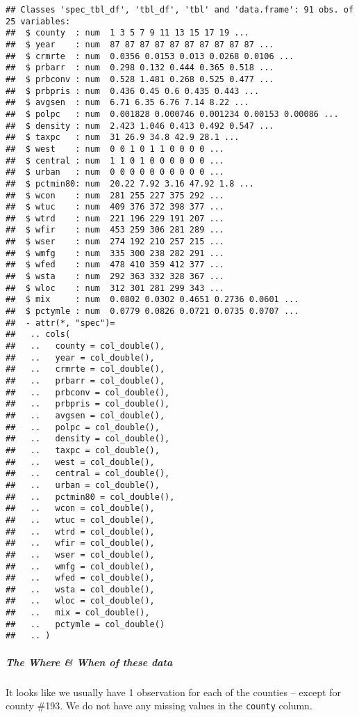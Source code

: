 \documentclass[]{article}
\let\oldsubparagraph\subparagraph
\renewcommand{\subparagraph}[1]{\oldsubparagraph{#1}\mbox{}}
\begin{document}
\begin{verbatim}
## Classes 'spec_tbl_df', 'tbl_df', 'tbl' and 'data.frame': 91 obs. of  25 variables:
##  $ county  : num  1 3 5 7 9 11 13 15 17 19 ...
##  $ year    : num  87 87 87 87 87 87 87 87 87 87 ...
##  $ crmrte  : num  0.0356 0.0153 0.013 0.0268 0.0106 ...
##  $ prbarr  : num  0.298 0.132 0.444 0.365 0.518 ...
##  $ prbconv : num  0.528 1.481 0.268 0.525 0.477 ...
##  $ prbpris : num  0.436 0.45 0.6 0.435 0.443 ...
##  $ avgsen  : num  6.71 6.35 6.76 7.14 8.22 ...
##  $ polpc   : num  0.001828 0.000746 0.001234 0.00153 0.00086 ...
##  $ density : num  2.423 1.046 0.413 0.492 0.547 ...
##  $ taxpc   : num  31 26.9 34.8 42.9 28.1 ...
##  $ west    : num  0 0 1 0 1 1 0 0 0 0 ...
##  $ central : num  1 1 0 1 0 0 0 0 0 0 ...
##  $ urban   : num  0 0 0 0 0 0 0 0 0 0 ...
##  $ pctmin80: num  20.22 7.92 3.16 47.92 1.8 ...
##  $ wcon    : num  281 255 227 375 292 ...
##  $ wtuc    : num  409 376 372 398 377 ...
##  $ wtrd    : num  221 196 229 191 207 ...
##  $ wfir    : num  453 259 306 281 289 ...
##  $ wser    : num  274 192 210 257 215 ...
##  $ wmfg    : num  335 300 238 282 291 ...
##  $ wfed    : num  478 410 359 412 377 ...
##  $ wsta    : num  292 363 332 328 367 ...
##  $ wloc    : num  312 301 281 299 343 ...
##  $ mix     : num  0.0802 0.0302 0.4651 0.2736 0.0601 ...
##  $ pctymle : num  0.0779 0.0826 0.0721 0.0735 0.0707 ...
##  - attr(*, "spec")=
##   .. cols(
##   ..   county = col_double(),
##   ..   year = col_double(),
##   ..   crmrte = col_double(),
##   ..   prbarr = col_double(),
##   ..   prbconv = col_double(),
##   ..   prbpris = col_double(),
##   ..   avgsen = col_double(),
##   ..   polpc = col_double(),
##   ..   density = col_double(),
##   ..   taxpc = col_double(),
##   ..   west = col_double(),
##   ..   central = col_double(),
##   ..   urban = col_double(),
##   ..   pctmin80 = col_double(),
##   ..   wcon = col_double(),
##   ..   wtuc = col_double(),
##   ..   wtrd = col_double(),
##   ..   wfir = col_double(),
##   ..   wser = col_double(),
##   ..   wmfg = col_double(),
##   ..   wfed = col_double(),
##   ..   wsta = col_double(),
##   ..   wloc = col_double(),
##   ..   mix = col_double(),
##   ..   pctymle = col_double()
##   .. )
\end{verbatim}

\hypertarget{the-where-when-of-these-data}{%
\subparagraph{The Where \& When of these
data}\label{the-where-when-of-these-data}}

It looks like we usually have 1 observation for each of the counties --
except for county \#193. We do not have any missing values in the
\texttt{county} column.
\end{document}
